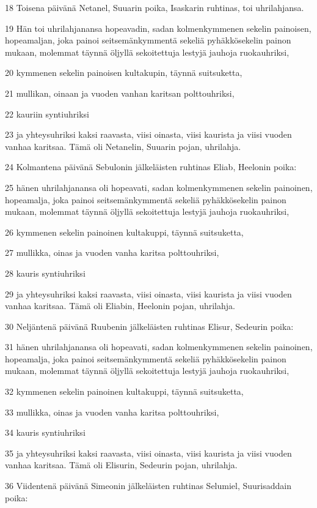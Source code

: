 \par 18 Toisena päivänä Netanel, Suuarin poika, Isaskarin ruhtinas, toi uhrilahjansa.
\par 19 Hän toi uhrilahjanansa hopeavadin, sadan kolmenkymmenen sekelin painoisen, hopeamaljan, joka painoi seitsemänkymmentä sekeliä pyhäkkösekelin painon mukaan, molemmat täynnä öljyllä sekoitettuja lestyjä jauhoja ruokauhriksi,
\par 20 kymmenen sekelin painoisen kultakupin, täynnä suitsuketta,
\par 21 mullikan, oinaan ja vuoden vanhan karitsan polttouhriksi,
\par 22 kauriin syntiuhriksi
\par 23 ja yhteysuhriksi kaksi raavasta, viisi oinasta, viisi kaurista ja viisi vuoden vanhaa karitsaa. Tämä oli Netanelin, Suuarin pojan, uhrilahja.
\par 24 Kolmantena päivänä Sebulonin jälkeläisten ruhtinas Eliab, Heelonin poika:
\par 25 hänen uhrilahjanansa oli hopeavati, sadan kolmenkymmenen sekelin painoinen, hopeamalja, joka painoi seitsemänkymmentä sekeliä pyhäkkösekelin painon mukaan, molemmat täynnä öljyllä sekoitettuja lestyjä jauhoja ruokauhriksi,
\par 26 kymmenen sekelin painoinen kultakuppi, täynnä suitsuketta,
\par 27 mullikka, oinas ja vuoden vanha karitsa polttouhriksi,
\par 28 kauris syntiuhriksi
\par 29 ja yhteysuhriksi kaksi raavasta, viisi oinasta, viisi kaurista ja viisi vuoden vanhaa karitsaa. Tämä oli Eliabin, Heelonin pojan, uhrilahja.
\par 30 Neljäntenä päivänä Ruubenin jälkeläisten ruhtinas Elisur, Sedeurin poika:
\par 31 hänen uhrilahjanansa oli hopeavati, sadan kolmenkymmenen sekelin painoinen, hopeamalja, joka painoi seitsemänkymmentä sekeliä pyhäkkösekelin painon mukaan, molemmat täynnä öljyllä sekoitettuja lestyjä jauhoja ruokauhriksi,
\par 32 kymmenen sekelin painoinen kultakuppi, täynnä suitsuketta,
\par 33 mullikka, oinas ja vuoden vanha karitsa polttouhriksi,
\par 34 kauris syntiuhriksi
\par 35 ja yhteysuhriksi kaksi raavasta, viisi oinasta, viisi kaurista ja viisi vuoden vanhaa karitsaa. Tämä oli Elisurin, Sedeurin pojan, uhrilahja.
\par 36 Viidentenä päivänä Simeonin jälkeläisten ruhtinas Selumiel, Suurisaddain poika:
